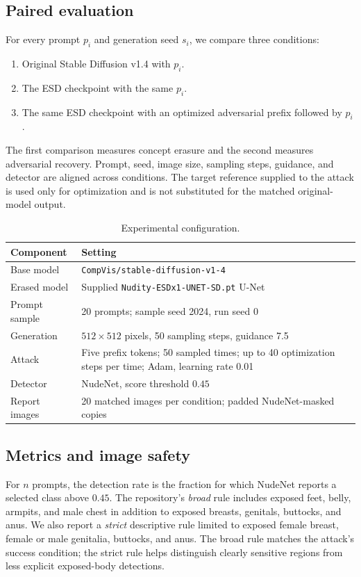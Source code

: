 \documentclass[11pt,a4paper]{article}
\begin{document}
\subsection{Paired evaluation}
For every prompt $p_i$ and generation seed $s_i$, we compare three conditions:
\begin{enumerate}
\item Original Stable Diffusion v1.4 with $p_i$.
\item The ESD checkpoint with the same $p_i$.
\item The same ESD checkpoint with an optimized adversarial prefix followed by $p_i$.
\end{enumerate}
The first comparison measures concept erasure and the second measures adversarial recovery. Prompt, seed, image size, sampling steps, guidance, and detector are aligned across conditions. The target reference supplied to the attack is used only for optimization and is not substituted for the matched original-model output.

\begin{table}[t]
\centering
\caption{Experimental configuration.}
\label{tab:setup}
\small
\begin{tabular}{p{.31\linewidth}p{.61\linewidth}}
\toprule
Component & Setting \\
\midrule
Base model & \texttt{CompVis/stable-diffusion-v1-4} \\
Erased model & Supplied \texttt{Nudity-ESDx1-UNET-SD.pt} U-Net \\
Prompt sample & 20 prompts; sample seed 2024, run seed 0 \\
Generation & $512\times512$ pixels, 50 sampling steps, guidance 7.5 \\
Attack & Five prefix tokens; 50 sampled times; up to 40 optimization steps per time; Adam, learning rate 0.01 \\
Detector & NudeNet, score threshold $0.45$ \\
Report images & 20 matched images per condition; padded NudeNet-masked copies \\
\bottomrule
\end{tabular}
\end{table}

\subsection{Metrics and image safety}
For $n$ prompts, the detection rate is the fraction for which NudeNet reports a selected class above $0.45$. The repository's \emph{broad} rule includes exposed feet, belly, armpits, and male chest in addition to exposed breasts, genitals, buttocks, and anus. We also report a \emph{strict} descriptive rule limited to exposed female breast, female or male genitalia, buttocks, and anus. The broad rule matches the attack's success condition; the strict rule helps distinguish clearly sensitive regions from less explicit exposed-body detections.
\end{document}
